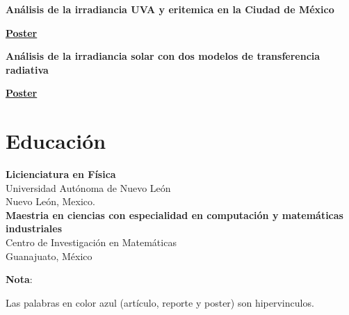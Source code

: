 \documentclass[a3paper]{adcv_color}
\newcommand{\proyect}[5]{\begin{minipage}{1\linewidth}
		\begin{minipage}{1\linewidth}
			\textbf{#1}
		\end{minipage}
	\end{minipage}
	\href{#4}{\textbf{#5}}
	\vspace{0.05cm}\\
}
\begin{document}
\proyect{Análisis de la irradiancia UVA y eritemica en la Ciudad de México}{Octubre 2019}{-0.2}{https://github.com/giovannilopez9808/Documents/raw/master/Posters/2019/AFA/Analisis\%20indice\%20UV/Analisis\%20de\%20irradiancia.pdf}{Poster}

\proyect{Análisis de la irradiancia solar con dos modelos de transferencia radiativa}{Agosto 2019}{0}{https://github.com/giovannilopez9808/Documents/raw/master/Posters/2019/CNF/Transferencia\%20radiativa/main.pdf}{Poster}

\section{Educación}

\textbf{Licienciatura en Física} \\
Universidad Autónoma de Nuevo León\\
Nuevo León, Mexico.\\

\textbf{Maestria en ciencias con especialidad en computación y matemáticas industriales}\\
Centro de Investigación en Matemáticas\\
Guanajuato, México
\begin{flushright}
	\changefontsizes{12pt}
	\textbf{Nota}:

	Las palabras en color azul (artículo, reporte y poster) son hipervinculos.
\end{flushright}
\end{document}
